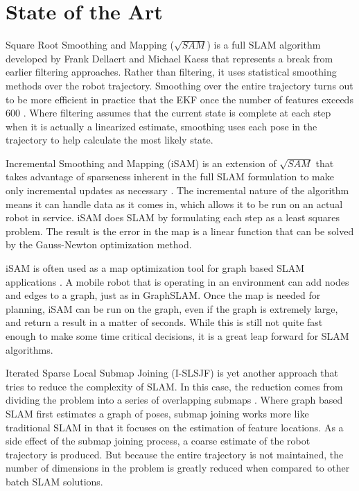 \documentclass[12pt]{article}
\begin{document}
\section{State of the Art}

Square Root Smoothing and Mapping ($\sqrt{SAM}$) is a full SLAM algorithm developed by Frank Dellaert and Michael Kaess that represents a break from earlier filtering approaches. Rather than filtering, it uses statistical smoothing methods over the robot trajectory.  Smoothing over the entire trajectory turns out to be more efficient in practice that the EKF once the number of features exceeds 600 \cite{Dellaert06ijrr}.  Where filtering assumes that the current state is complete at each step when it is actually a linearized estimate, smoothing uses each pose in the trajectory to help calculate the most likely state.

Incremental Smoothing and Mapping (iSAM) is an extension of $\sqrt{SAM}$ that takes advantage of sparseness inherent in the full SLAM formulation to make only incremental updates as necessary \cite{Kaess08tro}. The incremental nature of the algorithm means it can handle data as it comes in, which allows it to be run on an actual robot in service.  iSAM does SLAM by formulating each step as a least squares problem.  The result is the error in the map is a linear function that can be solved by the Gauss-Newton optimization method.

iSAM is often used as a map optimization tool for graph based SLAM applications \cite{Sunderhauf}.  A mobile robot that is operating in an environment can add nodes and edges to a graph, just as in GraphSLAM.  Once the map is needed for planning, iSAM can be run on the graph, even if the graph is extremely large, and return a result in a matter of seconds.  While this is still not quite fast enough to make some time critical decisions, it is a great leap forward for SLAM algorithms.

Iterated Sparse Local Submap Joining (I-SLSJF) is yet another approach that tries to reduce the complexity of SLAM.  In this case, the reduction comes from dividing the problem into a series of overlapping submaps  \cite{huang2008iterated}.  Where graph based SLAM first estimates a graph of poses, submap joining works more like traditional SLAM in that it focuses on the estimation of feature locations.  As a side effect of the submap joining process, a coarse estimate of the robot trajectory is produced.  But because the entire trajectory is not maintained, the number of dimensions in the problem is greatly reduced when compared to other batch SLAM solutions.
\end{document}
